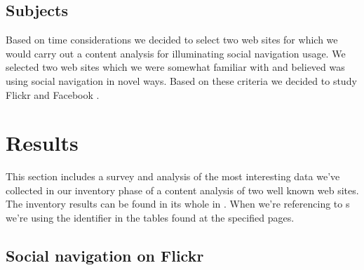 \subsection{Subjects}

Based on time considerations we decided to select two web sites for which
we would carry out a content analysis for illuminating social navigation
usage. We selected two web sites which we were somewhat familiar with and
believed was using social navigation in novel ways. Based on these criteria
we decided to study Flickr%
and Facebook%
.

\section{Results}

This section includes a survey and analysis of the most interesting
data we've collected in our inventory phase of a content analysis
of two well known web sites. The inventory results can be found in its whole
in . When we're referencing to s we're
using the identifier in the tables found at the specified pages.

\subsection{Social navigation on Flickr}
\label{section:analysis.flickr}

